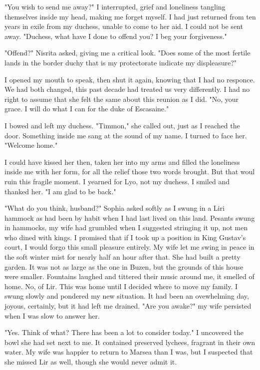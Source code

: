 \documentclass{article}
\begin{document}
"You wish to send me away?" I interrupted, grief and loneliness tangling themselves inside my head, making me forget myself. I had just returned from ten years in exile from my duchess, unable to come to her aid. I could not be sent away. "Duchess, what have I done to offend you? I beg your forgiveness."

"Offend?" Nisrita asked, giving me a critical look. "Does some of the most fertile lands in the border duchy that is my protectorate indicate my displeasure?"

I opened my mouth to speak, then shut it again, knowing that I had no responce. We had both changed, this past decade had treated us very differently. I had no right to assume that she felt the same about this reunion as I did. "No, your grace. I will do what I can for the duke of Escasaine."

I bowed and left my duchess. "Timmon," she called out, just as I reached the door. Something inside me sang at the sound of my name. I turned to face her. "Welcome home."

I could have kissed her then, taken her into my arms and filled the loneliness inside me with her form, for all the relief those two words brought. But that woul ruin this fragile moment. I yearned for Lyo, not my duchess. I smiled and thanked her. "I am glad to be back."

\vspace{.5cm}

"What do you think, husband?" Sophia asked softly as I swung in a Liri hammock as had been by habit when I had last lived on this land. Pesants swung in hammocks, my wife had grumbled when I suggested stringing it up, not men who dined with kings. I promised that if I took up a position in King Gustav's court, I would forgo this small pleasure entirely. My wife let me swing in peace in the soft winter mist for nearly half an hour after that. She had built a pretty garden. It was not as large as the one in Buzen, but the grounds of this house were smaller. Fountains laughed and tittered their music around me, it smelled of home. No, of Lir. This was home until I decided where to move my family. I swung slowly and pondered my new situation. It had been an ovewhelming day, joyous, certainly, but it had left me drained. "Are you awake?" my wife persisted when I was slow to answer her.

"Yes. Think of what? There has been a lot to consider today." I uncovered the bowl she had set next to me. It contained preserved lychees, fragrant in their own water. My wife was happier to return to Marsea than I was, but I suspected that she missed Lir as well, though she would never admit it.
\end{document}

